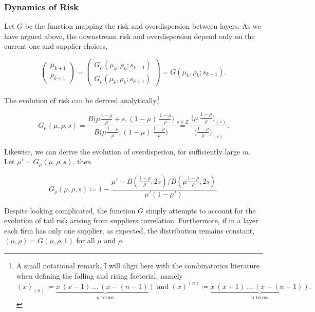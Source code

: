 \documentclass[american, abstract=on]{scrartcl}
\theoremstyle{plain}
\begin{document}
\subsubsection{Dynamics of Risk}

Let $G$ be the function mapping the risk and overdispersion between layers. As we have argued above, the downstream risk and overdispersion depend only on the current one and supplier choices,

\begin{equation}
  \begin{pmatrix}
    \mu_{k + 1} \\ \rho_{k + 1}
  \end{pmatrix} =  \begin{pmatrix}
    G_{\mu}(\mu_k, \rho_k; s_{k + 1}) \\ G_{\rho}(\mu_k, \rho_k; s_{k + 1})
  \end{pmatrix} = G(\mu_k, \rho_k; s_{k + 1}).
\end{equation}

The evolution of risk can be derived analytically\footnote{
  A small notational remark. I will align here with the combinatorics literature when defining the falling and rising factorial, namely \begin{equation*}
    (x)_{(n)} \coloneqq \underbrace{x \ (x - 1) \ \ldots \ (x - (n - 1))}_{n \text{ terms}} \text{ and } (x)^{(n)} \coloneqq \underbrace{x \ (x + 1) \ \ldots \ (x + (n - 1))}_{n \text{ terms}}.
  \end{equation*}
}

\begin{equation}
  G_\mu(\mu, \rho, s) = \frac{B\Big( \mu \frac{1 - \rho}{\rho} + s, (1 - \mu) \  \frac{1 - \rho}{\rho} \Big)}{B\Big( \mu \frac{1 - \rho}{\rho}, (1 - \mu) \ \frac{1 - \rho}{\rho} \Big)} \stackrel{s\in \mathbb{Z}}{=} \frac{\Big( \mu \  \frac{1 - \rho}{\rho} \Big)_{(s)}}{\Big( \frac{1 - \rho}{\rho} \Big)_{(s)}}.
\end{equation}

Likewise, we can derive the evolution of overdisperion, for sufficiently large $m$. Let $\mu' = G_\mu(\mu, \rho, s)$, then

\begin{equation}
  G_\rho(\mu, \rho, s) \coloneqq 1 - \frac{ \mu' - B\left(\frac{1 - \rho}{\rho}, 2s \right) \Big/ B\left(\mu \frac{1 - \rho}{\rho}, 2s \right)}{\mu' (1 - \mu')}.
\end{equation}

Despite looking complicated, the function $G$ simply attempts to account for the evolution of tail risk arising from suppliers correlation. Furthermore, if in a layer each firm has only one supplier, as expected, the distribution remains constant, $(\mu, \rho) = G(\mu, \rho, 1)$ for all $\mu$ and $\rho$.
\end{document}
